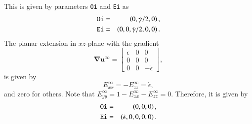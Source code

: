 \documentclass{book}
\begin{document}
This is given by parameters {\tt Oi} and {\tt Ei} as 
\begin{eqnarray}
  {\tt Oi}
  &=&
  \left(0, \dot{\gamma}/2, 0\right),\\
  {\tt Ei}
  &=&
  \left(
    0,
    0,
    \dot{\gamma}/2,
    0,
    0
  \right)
  .
\end{eqnarray}
The planar extension in $xz$-plane with the gradient 
\begin{equation}
  \bm{\nabla}\bm{u}^{\infty}
  =
  \left[
    \begin{array}{ccc}
      \dot{\epsilon} & 0 & 0 \\
      0 & 0 & 0 \\
      0 & 0 & -\dot{\epsilon}
    \end{array}
  \right]
  ,
\end{equation}
is given by 
\begin{equation}
  E^{\infty}_{xx} = -E^{\infty}_{zz} = \dot{\epsilon},
\end{equation}
and zero for others. Note that 
$E^{\infty}_{yy} = 1-E^{\infty}_{xx}-E^{\infty}_{zz} = 0$. 
Therefore, it is given by 
\begin{eqnarray}
  {\tt Oi}
  &=&
  \left(0, 0, 0\right),\\
  {\tt Ei}
  &=&
  \left(
    \dot{\epsilon},
    0,
    0,
    0,
    0
  \right)
  .
\end{eqnarray}
\end{document}
